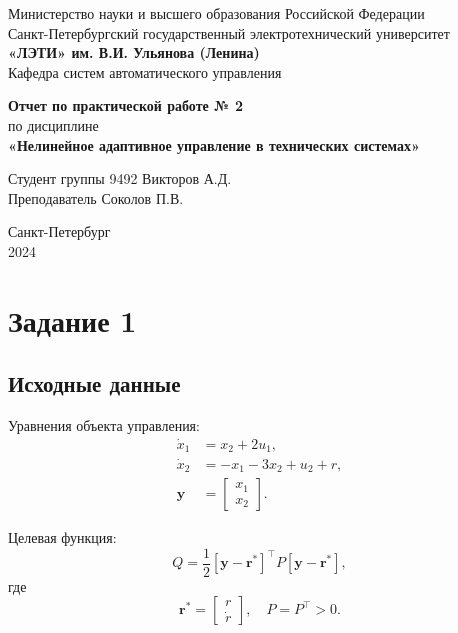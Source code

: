 \documentclass[a4paper,12pt]{extarticle} %
\begin{document}
\begin{titlepage}
    \begin{center}
        \large
        Министерство науки и высшего образования Российской Федерации \\
        Санкт-Петербургский государственный электротехнический университет \\
        \textbf{«ЛЭТИ» им. В.И. Ульянова (Ленина)} \\
        Кафедра систем автоматического управления

        \vfill

        \textbf{Отчет по практической работе № 2} \\
        по дисциплине \\
        \textbf{«Нелинейное адаптивное управление в технических системах»}

        \vfill

        Студент группы 9492 \hfill Викторов А.Д. \\
        Преподаватель \hfill Соколов П.В.

        \vfill
        Санкт-Петербург \\
        2024
    \end{center}
\end{titlepage}

\setcounter{page}{2}
\tableofcontents

\newpage

\section{Задание 1}

\subsection*{Исходные данные}
Уравнения объекта управления:
\begin{align*}
    \dot{x}_1 &= x_2 + 2u_1, \\
    \dot{x}_2 &= -x_1 - 3x_2 + u_2 + r, \\
    \mathbf{y} &= \begin{bmatrix} x_1 \\ x_2 \end{bmatrix}.
\end{align*}

Целевая функция:
\[
Q = \frac{1}{2} [\mathbf{y} - \mathbf{r}^*]^\top P [\mathbf{y} - \mathbf{r}^*],
\]
где 
\[
\mathbf{r}^* = \begin{bmatrix} r \\ \dot{r} \end{bmatrix}, \quad P = P^\top > 0.
\]
\end{document}
